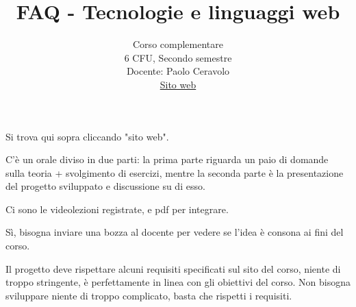 \documentclass{article}
\title{FAQ - \textbf{Tecnologie e linguaggi web}}
\date{}
\author{Corso complementare\\6 CFU, Secondo semestre\\
Docente: Paolo Ceravolo\\ 
\href{https://pceravolopwm.ariel.ctu.unimi.it/v5/home/Default.aspx}{Sito web}}
\begin{document}
 
\maketitle

\begin{QuestionList}

	 {
		     Si trova qui sopra cliccando "sito web".
		 }
	
     {
        C'è un orale diviso in due parti: la prima parte riguarda un paio di domande sulla teoria + svolgimento di esercizi, mentre la seconda parte è la presentazione del progetto sviluppato e discussione su di esso.
    }

     {
        Ci sono le videolezioni registrate, e pdf per integrare. 
    }

     {
        Sì, bisogna inviare una bozza al docente per vedere se l'idea è consona ai fini del corso.
    }

     {
        Il progetto deve rispettare alcuni requisiti specificati sul sito del corso, niente di troppo stringente, è perfettamente in linea con gli obiettivi del corso. Non bisogna sviluppare niente di troppo complicato, basta che rispetti i requisiti.
    }
 
\end{QuestionList}
\end{document}
